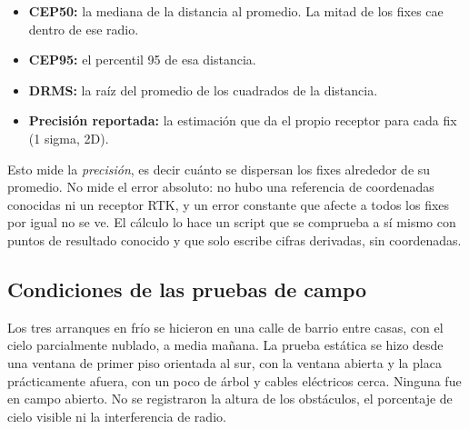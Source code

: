 \begin{itemize}
  \item \textbf{CEP50:} la mediana de la distancia al promedio. La mitad de los fixes cae dentro de ese radio.
  \item \textbf{CEP95:} el percentil 95 de esa distancia.
  \item \textbf{DRMS:} la raíz del promedio de los cuadrados de la distancia.
  \item \textbf{Precisión reportada:} la estimación que da el propio receptor para cada fix (1 sigma, 2D).
\end{itemize}

Esto mide la \emph{precisión}, es decir cuánto se dispersan los fixes alrededor de su promedio. No
mide el error absoluto: no hubo una referencia de coordenadas conocidas ni un receptor RTK, y un error
constante que afecte a todos los fixes por igual no se ve. El cálculo lo hace un script que se
comprueba a sí mismo con puntos de resultado conocido y que solo escribe cifras derivadas, sin
coordenadas.

\subsection{Condiciones de las pruebas de campo}

Los tres arranques en frío se hicieron en una calle de barrio entre casas, con el cielo parcialmente
nublado, a media mañana. La prueba estática se hizo desde una ventana de primer piso orientada al sur, con la
ventana abierta y la placa prácticamente afuera, con un poco de árbol y cables eléctricos cerca. Ninguna
fue en campo abierto. No se registraron la altura de los obstáculos, el porcentaje de cielo visible ni
la interferencia de radio.
